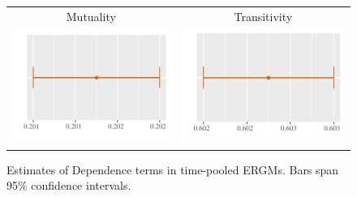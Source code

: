 \documentclass[reqno,onecolumn,letterpaper,12pt]{article}
\begin{document}
\begin{figure}[!h]
\centering
\begin{tabular}{c@{\hskip 0cm}c}
Mutuality & Transitivity \\
\includegraphics[height=.2\textheight, clip=true, trim=0cm 0cm 0cm .2cm]{draft_figures/plots_pooled/Mutuality.pdf}    &
\includegraphics[height=.2\textheight, clip=true, trim=0cm 0cm 0cm .2cm]{draft_figures/plots_pooled/Transitivity.pdf}
\end{tabular}
\caption{\label{fig:effectPlots4} Estimates of Dependence terms in time-pooled ERGMs. Bars span 95\% confidence intervals. }
\end{figure}
\end{document}
